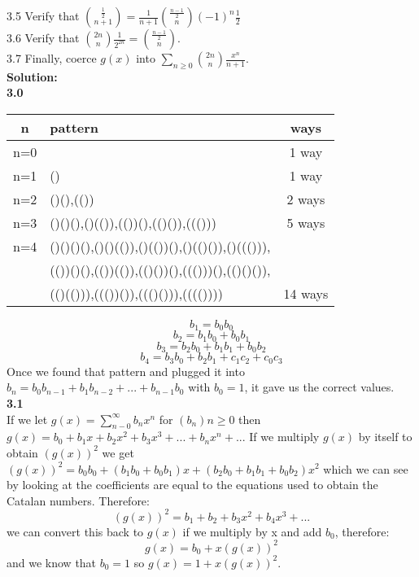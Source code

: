 \documentclass[10pt,a4paper]{report}
\begin{document}
	3.5 Verify that $\binom{\frac{1}{2}}{n+1} = \frac{1}{n+1}\binom{\frac{n-1}{2}}{n}(-1)^n\frac{1}{2}$\\
	3.6 Verify that $\binom{2n}{n}\frac{1}{2^{2n}} = \binom{\frac{n-1}{2}}{n}$.\\
	3.7 Finally, coerce $g(x)$ into $\sum_{n\geq0}^{}\binom{2n}{n}\frac{x^n}{n+1}$.\\
	\newline
	\textbf{Solution: }\\
	\newline
	\textbf{3.0}\\
	\begin{center}
		\begin{tabular}{|c||l|c|}
			\hline
			n&pattern&ways\\
			\hline
			\hline
			n=0&&1 way\\
			\hline
			n=1&()&1 way\\
			\hline
			n=2&()(),(())&2 ways\\
			\hline
			n=3&()()(),()(()),(())(),(()()),((()))&5 ways\\
			\hline
			n=4&()()()(),()()(()),()(())(),()(()()),()((())),&\\&(())()(),(())(()),(()())(),((()))(),(()()()),&\\&(()(())),((())()),((()())),(((())))&14 ways\\
			\hline		
		\end{tabular}
	\end{center}
	\[b_1 = b_0b_0\]\[b_2 = b_1b_0 + b_0b_1\]\[b_3 = b_2b_0 + b_1b_1 + b_0b_2\]\[b_4 = b_3b_0 + b_2b_1 + c_1c_2 + c_0c_3  \]
	Once we found that pattern and plugged it into $b_n = b_0b_{n-1} + b_1b_{n-2} + ... + b_{n-1}b_0$ with $b_0 = 1$, it gave us the correct values.\\
	\newline
	\textbf{3.1}\\
	If we let $g(x) = \sum_{n-0}^{\infty}b_nx^n$ for $(b_n)n\geq0$ then $g(x) = b_0 + b_1x + b_2x^2 + b_3x^3 + ... + b_nx^n + ...$ If we multiply $g(x)$ by itself to obtain $(g(x))^2$ we get $(g(x))^2 = b_0b_0 + (b_1b_0 + b_0b_1)x + (b_2b_0 + b_1b_1 + b_0b_2)x^2$ which we can see by looking at the coefficients are equal to the equations used to obtain the Catalan numbers.  Therefore:
	\[(g(x))^2 = b_1 + b_2 + b_3x^2 + b_4x^3 + ...\]
	we can convert this back to $g(x)$ if we multiply by x and add $b_0$, therefore:
	\[g(x) = b_0 + x(g(x))^2\]
	and we know that $b_0 = 1$ so $g(x) = 1 + x(g(x))^2$.\\
\end{document}
